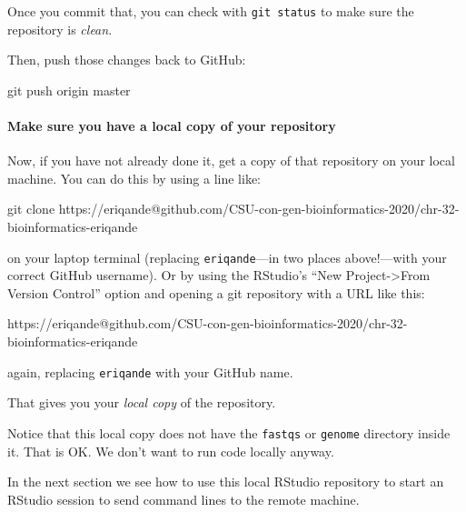 \documentclass[]{krantz}
\makeatletter
\newenvironment{Shaded}{\begin{snugshade}}{\end{snugshade}}
\newcommand{\ExtensionTok}[1]{#1}
\newcommand{\FunctionTok}[1]{\textcolor[rgb]{0,0,0}{#1}}
\newcommand{\NormalTok}[1]{#1}
\let\oldparagraph\paragraph
\renewcommand{\paragraph}[1]{\oldparagraph{#1}\mbox{}}
\newenvironment{kframe}{%
\medskip{}
\setlength{\fboxsep}{.8em}
 \def\at@end@of@kframe{}%
 \ifinner\ifhmode%
  \def\at@end@of@kframe{\end{minipage}}%
  \begin{minipage}{\columnwidth}%
 \fi\fi%
 \def\FrameCommand##1{\hskip\@totalleftmargin \hskip-\fboxsep
 \colorbox{shadecolor}{##1}\hskip-\fboxsep
     \hskip-\linewidth \hskip-\@totalleftmargin \hskip\columnwidth}%
 \MakeFramed {\advance\hsize-\width
   \@totalleftmargin\z@ \linewidth\hsize
   \@setminipage}}%
 {\par\unskip\endMakeFramed%
 \at@end@of@kframe}
\renewenvironment{Shaded}{\begin{kframe}}{\end{kframe}}
\makeatother
\begin{document}
Once you commit that, you can check with \texttt{git\ status} to make sure the repository
is \emph{clean}.

Then, push those changes back to GitHub:

\begin{Shaded}
\begin{Highlighting}[]
\FunctionTok{git}\NormalTok{ push origin master}
\end{Highlighting}
\end{Shaded}

\hypertarget{make-sure-you-have-a-local-copy-of-your-repository}{%
\paragraph{Make sure you have a local copy of your repository}\label{make-sure-you-have-a-local-copy-of-your-repository}}

Now, if you have not already done it, get a copy of that repository on
your local machine. You can do this by using a line like:

\begin{Shaded}
\begin{Highlighting}[]
\FunctionTok{git}\NormalTok{ clone https://eriqande@github.com/CSU-con-gen-bioinformatics-2020/chr-32-bioinformatics-eriqande}
\end{Highlighting}
\end{Shaded}

on your laptop terminal (replacing \texttt{eriqande}---in two places above!---with your correct GitHub username). Or by using the RStudio's ``New Project-\textgreater{}From Version Control'' option
and opening a git repository with a URL like this:

\begin{Shaded}
\begin{Highlighting}[]
\ExtensionTok{https}\NormalTok{://eriqande@github.com/CSU-con-gen-bioinformatics-2020/chr-32-bioinformatics-eriqande}
\end{Highlighting}
\end{Shaded}

again, replacing \texttt{eriqande} with your GitHub name.

That gives you your \emph{local copy} of the repository.

Notice that this local copy does not have the \texttt{fastqs} or \texttt{genome} directory
inside it. That is OK. We don't want to run code locally anyway.

In the next section we see how to use this local RStudio repository
to start an RStudio session to send command lines to the remote machine.
\end{document}
